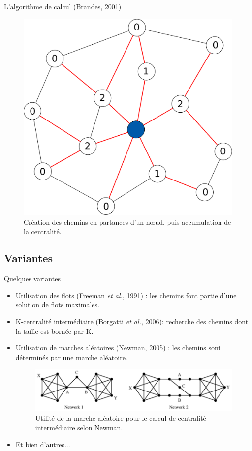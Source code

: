 \documentclass{beamer}
\begin{document}
\begin{frame}{L'algorithme de calcul (Brandes, 2001)}
	\begin{figure}[htbp]
		\centering
		\includegraphics[width=0.49\linewidth]{./img/algo_brandes.pdf}
		\caption{Création des chemins en partances d'un n\oe ud, puis accumulation de la centralité.}
		\label{fig:algo_brandes}
	\end{figure}
\end{frame}

	\subsection{Variantes}

\begin{frame}
	\begin{block}{Quelques variantes}
		\begin{itemize}
		    \item<1-> Utilisation des flots (Freeman \textit{et al.}, 1991) : les chemins font partie d'une solution de flots maximales.
		    \item<2-> K-centralité intermédiaire (Borgatti \textit{et al.}, 2006): recherche des chemins dont la taille est bornée par K.
		    \item<3-> Utilisation de marches aléatoires (Newman, 2005) : les chemins sont déterminés par une marche aléatoire.
		    
		    \begin{figure}[htbp]
				\centering
				\includegraphics[width=0.7\linewidth]{./img/random_walk_betwenness_graph_newman.png}
				\caption{Utilité de la marche aléatoire pour le calcul de centralité intermédiaire selon Newman.}
				\label{fig:algo_brandes}
			\end{figure}
		    
		    \item<4-> Et bien d'autres...
		\end{itemize}
	\end{block}
\end{frame}
\end{document}
